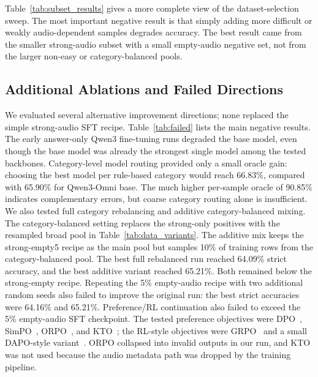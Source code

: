 \documentclass{article}
\begin{document}
Table~\ref{tab:subset_results} gives a more complete view of the dataset-selection sweep.
The most important negative result is that simply adding more difficult or weakly audio-dependent samples degrades accuracy.
The best result came from the smaller strong-audio subset with a small empty-audio negative set, not from the larger non-easy or category-balanced pools.



\subsection{Additional Ablations and Failed Directions}
\label{sec:failed}


We evaluated several alternative improvement directions; none replaced the simple strong-audio SFT recipe.
Table~\ref{tab:failed} lists the main negative results.
The early answer-only Qwen3 fine-tuning runs degraded the base model, even though the base model was already the strongest single model among the tested backbones.
Category-level model routing provided only a small oracle gain: choosing the best model per rule-based category would reach 66.83\%, compared with 65.90\% for Qwen3-Omni base.
The much higher per-sample oracle of 90.85\% indicates complementary errors, but coarse category routing alone is insufficient.
We also tested full category rebalancing and additive category-balanced mixing.
The category-balanced setting replaces the strong-only positives with the resampled broad pool in Table~\ref{tab:data_variants}.
The additive mix keeps the strong-empty5 recipe as the main pool but samples 10\% of training rows from the category-balanced pool.
The best full rebalanced run reached 64.09\% strict accuracy, and the best additive variant reached 65.21\%.
Both remained below the strong-empty recipe.
Repeating the 5\% empty-audio recipe with two additional random seeds also failed to improve the original run: the best strict accuracies were 64.16\% and 65.21\%.
Preference/RL continuation also failed to exceed the 5\% empty-audio SFT checkpoint.
The tested preference objectives were DPO~\cite{rafailov2023dpo}, SimPO~\cite{meng2024simpo}, ORPO~\cite{hong2024orpo}, and KTO~\cite{ethayarajh2024kto}; the RL-style objectives were GRPO~\cite{shao2024deepseekmath} and a small DAPO-style variant~\cite{yu2025dapo}.
ORPO collapsed into invalid outputs in our run, and KTO was not used because the audio metadata path was dropped by the training pipeline.
\end{document}
